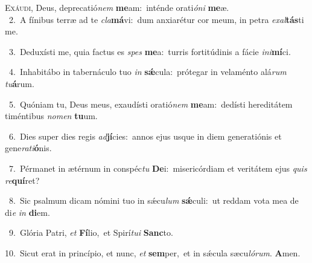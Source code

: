 \lettrine{\initial\textcolor{\initialcolor}{E}}{xáudi,} Deus, deprecatió\textit{nem} \textbf{me}\-am:~\star inténde orati\-\textit{ó}\-\textit{ni} \textbf{me}\-æ.\\
{\numbfont\textcolor{\numbcolor}{~2.}}~A fínibus terræ ad te \textit{cla}\-\textbf{má}vi:~\star dum anxiarétur cor meum, in petra \textit{ex}\-\textit{al}\textbf{tás}ti me.\par
{\numbfont\textcolor{\numbcolor}{~3.}}~Deduxísti me, quia factus es \textit{spes} \textbf{me}\-a:~\star turris fortitúdinis a fácie \textit{in}\-\textit{i}\textbf{mí}ci.\par
{\numbfont\textcolor{\numbcolor}{~4.}}~Inhabitábo in tabernáculo tuo \textit{in} \textbf{sǽ}\-cula:~\star prótegar in velaménto alá\textit{rum} \textit{tu}\-\textbf{á}rum.\par
{\numbfont\textcolor{\numbcolor}{~5.}}~Quóniam tu, Deus meus, exaudísti oratió\textit{nem} \textbf{me}\-am:~\star dedísti hereditátem timéntibus \textit{no}\-\textit{men} \textbf{tu}\-um.\par
{\numbfont\textcolor{\numbcolor}{~6.}}~Dies super dies regis \textit{ad}\-\textbf{jí}cies:~\star annos ejus usque in diem generatiónis et gene\-\textit{ra}\-\textit{ti}\textbf{ó}nis.\par
{\numbfont\textcolor{\numbcolor}{~7.}}~Pérmanet in ætérnum in conspéc\textit{tu} \textbf{De}\-i:~\star misericórdiam et veritátem ejus \textit{quis} \textit{re}\-\textbf{quí}ret?\par
{\numbfont\textcolor{\numbcolor}{~8.}}~Sic psalmum dicam nómini tuo in sǽcu\textit{lum} \textbf{sǽ}\-culi:~\star ut reddam vota mea de di\textit{e} \textit{in} \textbf{di}\-em.\par
{\numbfont\textcolor{\numbcolor}{~9.}}~Glória Patri, \textit{et} \textbf{Fí}\-lio,~\star et Spirí\-\textit{tu}\-\textit{i} \textbf{Sanc}\-to.\par
{\numbfont\textcolor{\numbcolor}{10.}}~Sicut erat in princípio, et nunc, \textit{et} \textbf{sem}\-per,~\star et in sǽcula sæcu\-\textit{ló}\-\textit{rum}. \textbf{A}\-men.\par
